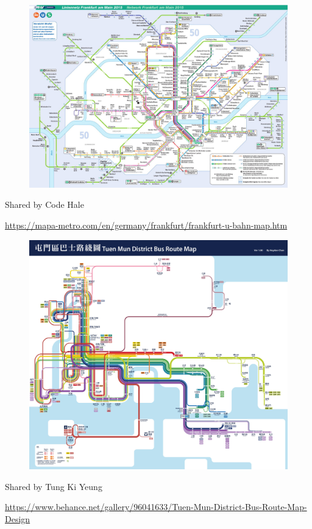\documentclass[aspectratio=169]{beamer}
\begin{document}
\begin{frame}
	
	\begin{figure}
		\centering
		\includegraphics[width=0.86\linewidth]{images/frankfurt.jpg}
	\end{figure}
	
	\tiny Shared by Code Hale
	
	\tiny \url{https://mapa-metro.com/en/germany/frankfurt/frankfurt-u-bahn-map.htm}
	
\end{frame}



\begin{frame}
	
	\begin{figure}
		\centering
		\includegraphics[width=0.68\linewidth]{images/hong_kong_bus.jpg}
	\end{figure}
	
	\tiny Shared by Tung Ki Yeung
	
	\tiny \url{https://www.behance.net/gallery/96041633/Tuen-Mun-District-Bus-Route-Map-Design}
	
\end{frame}
\end{document}
